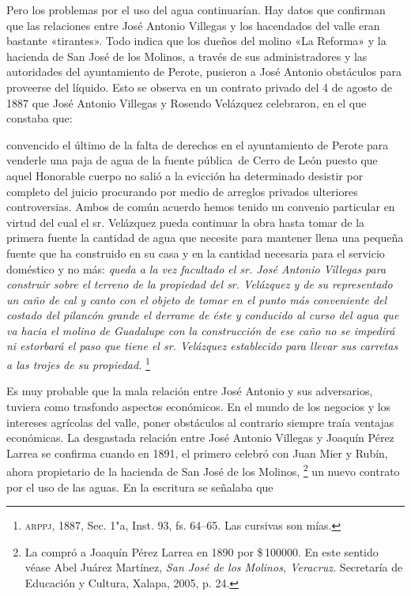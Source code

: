 \documentclass[14pt,twoside,final]{extbook} %
\let\oldfootnote\footnote
\renewcommand\footnote[1]{%
\oldfootnote{\hspace{1mm}#1}}
\begin{document}
Pero los problemas por el uso del agua continuarían. Hay datos que confirman que las relaciones entre José Antonio Villegas y los hacendados del valle eran bastante «tirantes». Todo indica que los dueños del molino «La Reforma» y la hacienda de San José de los Molinos, a través de sus administradores y las autoridades del ayuntamiento de Perote, pusieron a José Antonio obstáculos para proveerse del líquido. Esto se observa en un contrato privado del 4 de agosto de 1887 que José Antonio Villegas y Rosendo Velázquez celebraron, en el que constaba que:
\begin{quoting}
convencido el último de la falta de derechos en el ayuntamiento de Perote para venderle una paja de agua de la fuente pública~de Cerro de León puesto que aquel Honorable cuerpo no salió a la evicción ha determinado desistir por completo del juicio procurando por medio de arreglos privados ulteriores controversias. Ambos de común acuerdo hemos tenido un convenio particular en virtud del cual el sr. Velázquez pueda continuar la obra hasta tomar de la primera fuente la cantidad de agua que necesite para mantener llena una pequeña fuente que ha construido en su casa y en la cantidad necesaria para el servicio doméstico y no más: \emph{queda a la vez facultado el sr. José Antonio Villegas para construir sobre el terreno de la propiedad del sr. Velázquez y de su representado un caño de cal y canto con el objeto de tomar en el punto más conveniente del costado del pilancón grande el derrame de éste y conducido al curso del agua que va hacia el molino de Guadalupe con la construcción de ese caño no se impedirá ni estorbará el paso que tiene el sr. Velázquez establecido para llevar sus carretas a las trojes de su propiedad.}\footnote{\textsc{arppj}, 1887, Sec. 1"a, Inst. 93, fs. 64--65. Las cursivas son mías.}
\end{quoting}
Es muy probable que la mala relación entre José Antonio y sus adversarios, tuviera como trasfondo aspectos económicos. En el mundo de los negocios y los intereses agrícolas del valle, poner obstáculos al contrario siempre traía ventajas económicas. La desgastada relación entre José Antonio Villegas y Joaquín Pérez Larrea se confirma cuando en 1891, el primero celebró con Juan Mier y Rubín, ahora propietario de la hacienda de San José de los Molinos,\footnote{La compró a Joaquín Pérez Larrea en 1890 por \$\,100000. En este sentido véase Abel Juárez Martínez, \emph{San José de los Molinos, Veracruz.} Secretaría de Educación y Cultura, Xalapa, 2005, p. 24.} un nuevo contrato por el uso de las aguas. En la escritura se señalaba que
\end{document}
